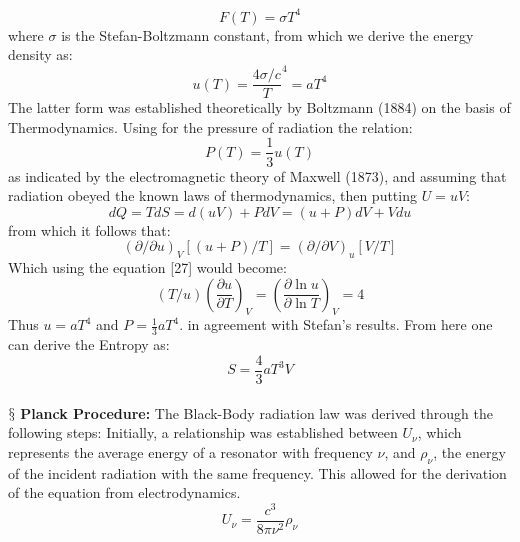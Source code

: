 \documentclass[9pt,a4paper, twocolumn]{article}
\newcounter{theo}
\newcommand{\newpoint}[1]{\ \\ \indent$\mathsection$ \textbf{#1}}
\begin{document}
            \begin{equation}
                F(T) = \sigma T^4
            \end{equation}
            where $\sigma$ is the Stefan-Boltzmann constant, from which we derive the energy density as:
            \begin{equation}
                u(T) = \frac{4\sigma / c}T^4 = aT^4
            \end{equation}
            The latter form was established theoretically by Boltzmann (1884) on the basis of Thermodynamics. Using for the pressure of radiation the relation:
            \begin{equation}
                P(T) = \frac13 u(T)
            \end{equation}
            as indicated by the electromagnetic theory of Maxwell (1873), and assuming that radiation obeyed the known laws of thermodynamics, then putting $U=uV$:
            \begin{equation}
                dQ = TdS = d(uV) + PdV = (u+P)dV + Vdu
            \end{equation}
            from which it follows that:
            \begin{equation}
                (\partial/\partial u)_V [(u+P)/T] = (\partial/\partial V)_u [V/T]
            \end{equation}
            Which using the equation [27] would become:
            \begin{equation}
                (T/u)\left(\frac{\partial u}{\partial T}\right)_V = \left(\frac{\partial \ln u}{\partial \ln T}\right)_V = 4
            \end{equation}
            Thus $u = aT^4$ and $P=\frac13 aT^4$. in agreement with Stefan's results. From here one can derive the Entropy as:
            \begin{equation}
                S = \frac43 aT^3V
            \end{equation}
            \newpoint{Planck Procedure:} The Black-Body radiation law was derived through the following steps: Initially, a relationship was established between $U_\nu$, which represents the average energy of a resonator with frequency $\nu$, and $\rho_\nu$, the energy of the incident radiation with the same frequency. This allowed for the derivation of the equation from electrodynamics.
            \begin{equation}
                U_\nu =\frac{c^3}{8\pi\nu^2}\rho_\nu
            \end{equation}
\end{document}
